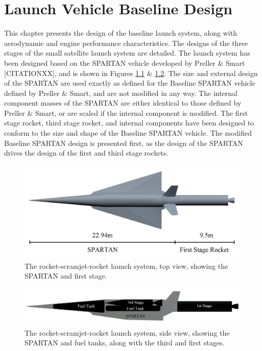 
\cleardoublepage
\chapter{Launch Vehicle Baseline Design}\label{chapter:methodology}

This chapter presents the design of the baseline launch system, along with aerodynamic and engine performance characteristics. The designs of the three stages of the small satellite launch system are detailed. The launch system has been designed based on the SPARTAN vehicle developed by Preller \& Smart [CITATIONXX], and is shown in Figures \ref{fig:NoInternal} \& \ref{fig:INTERNALS}. The size and external design of the SPARTAN are used exactly as defined for the Baseline SPARTAN vehicle defined by Preller \& Smart, and are not modified in any way. The internal component masses of the SPARTAN are either identical to those defined by Preller \& Smart, or are scaled if the internal component is modified. The first stage rocket, third stage rocket, and internal components have been designed to conform to the size and shape of the Baseline SPARTAN vehicle.
The modified Baseline SPARTAN design is presented first, as the design of the SPARTAN drives the design of the first and third stage rockets. 


\begin{figure}
	\centering
	\includegraphics[width=0.7\linewidth]{figures/3_vehicle_design/NoInternal}
	\caption{The rocket-scramjet-rocket launch system, top view, showing the SPARTAN and first stage.}
	\label{fig:NoInternal}
\end{figure}

\begin{figure}
	\centering
	\includegraphics[width=0.7\linewidth]{figures/3_vehicle_design/INTERNALS}
	\caption{The rocket-scramjet-rocket launch system, side view, showing the SPARTAN and fuel tanks, along with the third and first stages.}
	\label{fig:INTERNALS}
\end{figure}





